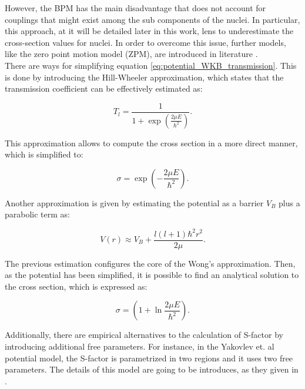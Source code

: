 \documentclass[openany]{book}
\begin{document}
However, the BPM has the main disadvantage that does not account for couplings that might exist among the sub components of the nuclei. In particular, this approach, at it will be detailed later in this work, lens to underestimate the cross-section values for nuclei. In order to overcome this issue, further models, like the zero point motion model (ZPM), are introduced in literature \cite{duarte_gasques_oliveira_zagatto_chamon_medina_added_seale_alcantara-nunez_rossi_et_2015, nobre_chamon_gasques_carlson_thompson_2007}.   \\  

There are ways for simplifying equation   \ref{eq:potential_WKB_transmission}. This is done by introducing the Hill-Wheeler approximation, which states that the transmission coefficient can be effectively estimated as: 

\begin{equation} \label{eq:potential_WKB_transmission_HW}
	T_l =  \frac{1}{1 + \exp {\left ( \frac {2\mu E} {\hbar^2} \right)} }.
\end{equation}

This approximation allows to compute the cross section in a more direct manner, which is simplified to: 

\begin{equation} \label{eq:potential_WKB_crossSection_HW}
	\sigma = \exp{\left( - \frac{2\mu E}{\hbar^2}\right)}.
\end{equation}

Another approximation is given by estimating the potential as a barrier $V_B$ plus a parabolic term as:

\begin{equation} \label{eq:potential_WKB_potential_Wong}
	V(r) \approx V_B + \frac{l(l+1) \hbar^2  r^2 }{2\mu}.
\end{equation}

The previous estimation configures the core of the Wong's approximation. Then, as the potential has been simplified, it is possible to find an analytical solution to the cross section, which is expressed as: 

\begin{equation} \label{eq:potential_WKB_crossSection_Wong}
	\sigma = \left( 1 + \ln{\frac{2\mu E}{\hbar ^2}} \right).
\end{equation}

Additionally, there are empirical alternatives to the calculation of S-factor by introducing additional free parameters. For instance, in the Yakovlev et. al potential model, the S-factor is parametrized in two regions and it uses two free parameters.  The details of this model are going to be introduces, as they given in \cite{yakovlev_beard_gasques_wiescher_2010}. 
\end{document}
